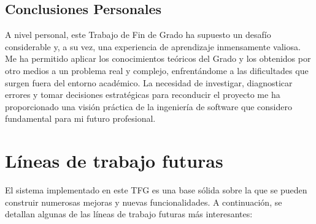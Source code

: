 \subsection{Conclusiones Personales}
A nivel personal, este Trabajo de Fin de Grado ha supuesto un desafío considerable y, a su vez, una experiencia de aprendizaje inmensamente valiosa. Me ha permitido aplicar los conocimientos teóricos del Grado y los obtenidos por otro medios a un problema real y complejo, enfrentándome a las dificultades que surgen fuera del entorno académico. La necesidad de investigar, diagnosticar errores y tomar decisiones estratégicas para reconducir el proyecto me ha proporcionado una visión práctica de la ingeniería de software que considero fundamental para mi futuro profesional.

\section{Líneas de trabajo futuras}

El sistema implementado en este TFG es una base sólida sobre la que se pueden construir numerosas mejoras y nuevas funcionalidades. A continuación, se detallan algunas de las líneas de trabajo futuras más interesantes:

